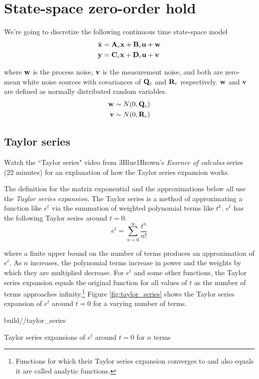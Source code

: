 \section{State-space zero-order hold}
\label{sec:state-space_zoh}

We're going to discretize the following continuous time state-space model
\begin{align*}
  \dot{\mathbf{x}} &= \mathbf{A}_c\mathbf{x} + \mathbf{B}_c\mathbf{u} + \mathbf{w} \\
  \mathbf{y} &= \mathbf{C}_c\mathbf{x} + \mathbf{D}_c\mathbf{u} + \mathbf{v}
\end{align*}

where $\mathbf{w}$ is the process noise, $\mathbf{v}$ is the measurement noise, and
both are zero-mean white noise sources with covariances of $\mathbf{Q}_c$ and
$\mathbf{R}_c$ respectively. $\mathbf{w}$ and $\mathbf{v}$ are defined as normally
distributed random variables.
\begin{align*}
  \mathbf{w} &\sim N(0, \mathbf{Q}_c) \\
  \mathbf{v} &\sim N(0, \mathbf{R}_c)
\end{align*}

\subsection{Taylor series}
\begin{remark}
  Watch the ``Taylor series" video from 3Blue1Brown's \textit{Essence of
  calculus} series (22 minutes) \cite{bib:3b1b_calculus_taylor_series} for an
  explanation of how the Taylor series expansion works.
\end{remark}

The definition for the matrix exponential and the approximations below all use
the \textit{Taylor series expansion}. The Taylor series is a method of
approximating a function like $e^t$ via the summation of weighted polynomial
terms like $t^k$. $e^t$ has the following Taylor series around $t = 0$.
\begin{equation*}
  e^t = \sum_{n = 0}^\infty \frac{t^n}{n!}
\end{equation*}

where a finite upper bound on the number of terms produces an approximation of
$e^t$. As $n$ increases, the polynomial terms increase in power and the weights
by which they are multiplied decrease. For $e^t$ and some other functions, the
Taylor series expansion equals the original function for all values of $t$ as
the number of terms approaches infinity.\footnote{Functions for which their
Taylor series expansion converges to and also equals it are called analytic
functions.} Figure \ref{fig:taylor_series} shows the Taylor series expansion of
$e^t$ around $t = 0$ for a varying number of terms.
\begin{svg}{build/\chapterpath/taylor_series}
  \caption{Taylor series expansions of $e^t$ around $t = 0$ for $n$ terms}
  \label{fig:taylor_series}
\end{svg}

